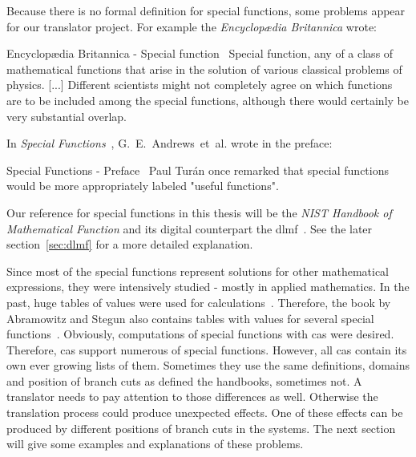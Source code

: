 Because there is no formal definition for special functions, some problems appear for our translator project. For example the \textit{Encyclop\ae{dia} Britannica} wrote:
\begin{myQuote}{Encyclop\ae{dia} Britannica - Special function~\cite{SpecialFunctions:britannica}}
	Special function, any of a class of mathematical functions that arise in the solution of various classical problems of physics. [...] Different scientists might not completely agree on which functions are to be included among the special functions, although there would certainly be very substantial overlap.
\end{myQuote}

In \textit{Special Functions}~\cite{SF:Book}, G.~E.~Andrews~et~al. wrote in the preface:
\begin{myQuote}{Special Functions - Preface~\cite{SF:Book}}
Paul Tur\'an once remarked that special functions would be more appropriately labeled "useful functions".
\end{myQuote}

Our reference for special functions in this thesis will be the \textit{NIST Handbook of Mathematical Function} and its digital counterpart the \gls{dlmf}~\cite{NIST:DLMF}. See the later section~\ref{sec:dlmf} for a more detailed explanation. 

Since most of the special functions represent solutions for other mathematical expressions, they were intensively studied - mostly in applied mathematics. In the past, huge tables of values were used for calculations~\cite{Tables}. Therefore, the book by Abramowitz and Stegun also contains tables with values for several special functions~\cite{AbramowitzStegun}. Obviously, computations of special functions with \gls{cas} were desired. Therefore, \gls{cas} support numerous of special functions. However, all \gls{cas} contain its own ever growing lists of them. Sometimes they use the same definitions, domains and position of branch cuts as defined the handbooks, sometimes not. A translator needs to pay attention to those differences as well. Otherwise the translation process could produce unexpected effects. One of these effects can be produced by different positions of branch cuts in the systems. The next section will give some examples and explanations of these problems.

